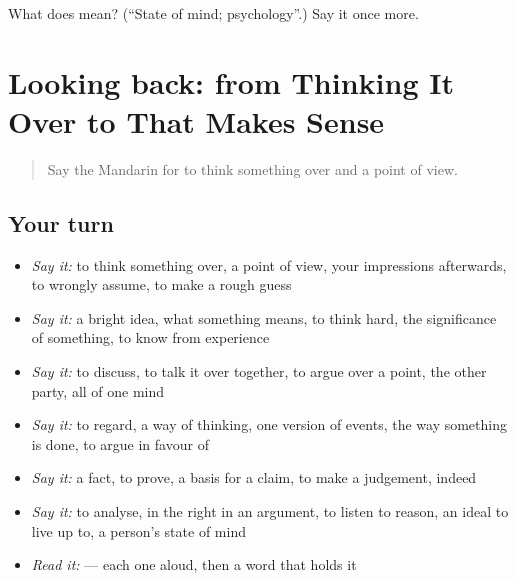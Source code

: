 \begin{tcolorbox}[breakable,colback=teal!4,colframe=teal!35!black,title={Before you move on}]
What does  mean? (\textquotedblleft{}State of mind; psychology\textquotedblright{}.) Say it once more.
\end{tcolorbox}
\section[(dialogue)]{Looking back: from Thinking It Over to That Makes Sense}

\label{lesson:ZH-R351-review-346-351}



\begin{quote}
Say the Mandarin for to think something over and a point of view.
\end{quote}

\subsection*{Your turn}
\begin{itemize}
\raggedright
  \item \emph{Say it:} to think something over, a point of view, your impressions afterwards, to wrongly assume, to make a rough guess
  \item \emph{Say it:} a bright idea, what something means, to think hard, the significance of something, to know from experience
  \item \emph{Say it:} to discuss, to talk it over together, to argue over a point, the other party, all of one mind
  \item \emph{Say it:} to regard, a way of thinking, one version of events, the way something is done, to argue in favour of
  \item \emph{Say it:} a fact, to prove, a basis for a claim, to make a judgement, indeed
  \item \emph{Say it:} to analyse, in the right in an argument, to listen to reason, an ideal to live up to, a person's state of mind
  \item \emph{Read it:}    — each one aloud, then a word that holds it
\end{itemize}

